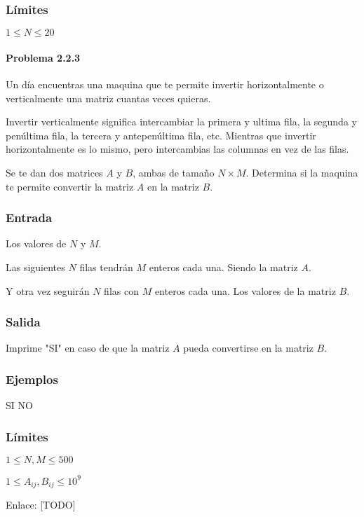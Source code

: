 \subsubsection*{Límites}
\begin{plimits}
	\item \(1\leq N \leq 20\)
\end{plimits}

\problembreak

\paragraph{Problema 2.2.3}  Un día encuentras una maquina que te permite invertir horizontalmente o verticalmente una matriz cuantas veces quieras. 

Invertir verticalmente significa intercambiar la primera y ultima fila, la segunda y penúltima fila, la tercera y antepenúltima fila, etc. Mientras que invertir horizontalmente es lo mismo, pero intercambias las columnas en vez de las filas.

Se te dan dos matrices \(A\) y \(B\), ambas de tamaño \(N\times M\). Determina si la maquina te permite convertir la matriz \(A\) en la matriz \(B\).

\subsubsection*{Entrada}
Los valores de \(N\) y \(M\).

Las siguientes \(N\) filas tendrán \(M\) enteros cada una. Siendo la matriz \(A\).

Y otra vez seguirán \(N\) filas con \(M\) enteros cada una. Los valores de la matriz \(B\). 

\subsubsection*{Salida}
Imprime "SI" en caso de que la matriz \(A\) pueda convertirse en la matriz \(B\).

\subsubsection*{Ejemplos}
\begin{casebox2}
	{SI}	
	 {NO}
\end{casebox2}

\subsubsection*{Límites}

\begin{plimits}
	\item \(1\leq N,M\leq 500 \)
	\item \(1\leq A_{ij}, B_{ij}\leq 10^9 \)
\end{plimits}

Enlace: [TODO]